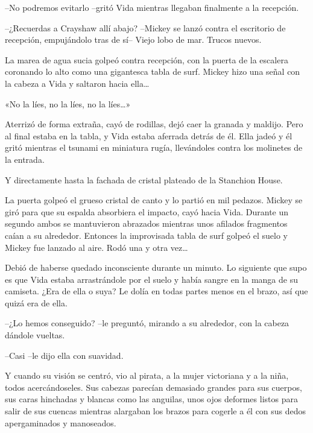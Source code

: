 {--No podremos evitarlo --gritó Vida mientras llegaban finalmente a la
recepción.}

{--¿Recuerdas a Crayshaw allí abajo? --Mickey se lanzó contra el
 escritorio de recepción, empujándolo tras de sí-- Viejo lobo de mar.
Trucos nuevos.}

{La marea de agua sucia golpeó contra recepción, con la puerta de la
 escalera coronando lo alto como una gigantesca tabla de surf. Mickey
 hizo una señal con la cabeza a Vida y saltaron hacia ella\ldots{}}

{«No la líes, no la líes, no la líes\ldots{}»}

{Aterrizó de forma extraña, cayó de rodillas, dejó caer la granada y
 maldijo. Pero al final estaba en la tabla, y Vida estaba aferrada detrás
 de él. Ella jadeó y él gritó mientras el tsunami en miniatura rugía,
llevándoles contra los molinetes de la entrada.}

{Y directamente hasta la fachada de cristal plateado de la Stanchion
House.}

{La puerta golpeó el grueso cristal de canto y lo partió en mil pedazos.
 Mickey se giró para que su espalda absorbiera el impacto, cayó hacia
 Vida. Durante un segundo ambos se mantuvieron abrazados mientras unos
 afilados fragmentos caían a su alrededor. Entonces la improvisada tabla
 de surf golpeó el suelo y Mickey fue lanzado al aire. Rodó una y otra
 vez\ldots{}}

{Debió de haberse quedado inconsciente durante un minuto. Lo siguiente
 que supo es que Vida estaba arrastrándole por el suelo y había sangre en
 la manga de su camiseta. ¿Era de ella o suya? Le dolía en todas partes
menos en el brazo, así que quizá era de ella.}

{--¿Lo hemos conseguido? --le preguntó, mirando a su alrededor, con la
cabeza dándole vueltas.}

{--Casi --le dijo ella con suavidad.}

{Y cuando su visión se centró, vio al pirata, a la mujer victoriana y a
 la niña, todos acercándoseles. Sus cabezas parecían demasiado grandes
 para sus cuerpos, sus caras hinchadas y blancas como las anguilas, unos
 ojos deformes listos para salir de sus cuencas mientras alargaban los
brazos para cogerle a él con sus dedos apergaminados y manoseados.}
